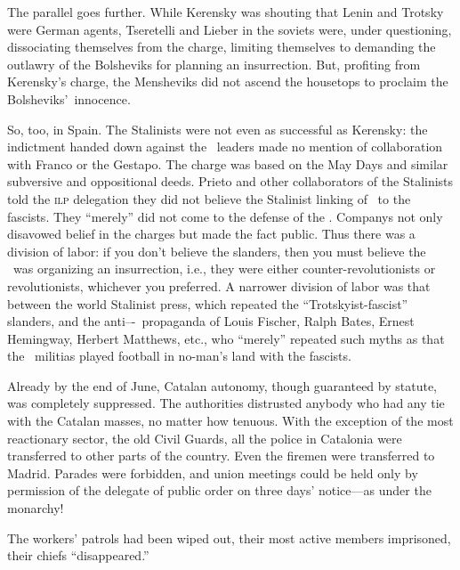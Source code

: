 The parallel goes further. While Kerensky was shouting that Lenin and Trotsky were German agents, Tseretelli and Lieber in the soviets were, under questioning, dissociating themselves from the charge, limiting themselves to demanding the outlawry of the Bolsheviks for planning an insurrection. But, profiting from Kerensky’s charge, the Mensheviks did not ascend the housetops to proclaim the Bolsheviks’~innocence.

So, too, in Spain. The Stalinists were not even as successful as Kerensky: the indictment handed down against the \POUM\ leaders made no mention of collaboration with Franco or the Gestapo. The charge was based on the May Days and similar subversive and oppositional deeds. Prieto and other collaborators of the Stalinists told the \textsc{ilp} delegation they did not believe the Stalinist linking of \POUM\ to the fascists. They ``merely'' did not come to the defense of the \POUM. Companys not only disavowed belief in the charges but made the fact public. Thus there was a division of labor: if you don’t believe the slanders, then you must believe the \POUM\ was organizing an insurrection, i.e., they were either counter-revolutionists or revolutionists, whichever you preferred. A narrower division of labor was that between the world Stalinist press, which repeated the ``Trotskyist-fascist'' slanders, and the anti--\POUM-\CNT\ propaganda of Louis Fischer,{\indexLFischer{}} Ralph Bates, Ernest Hemingway, Herbert Matthews, etc., who ``merely'' repeated such myths as that the \POUM\ militias played football in no-man’s land with the fascists.

\dinkus

Already by the end of June, Catalan autonomy, though guaranteed by statute, was completely suppressed. The authorities distrusted anybody who had any tie with the Catalan masses, no matter how tenuous. With the exception of the most reactionary sector, the old Civil Guards, all the police in Catalonia were transferred to other parts of the country. Even the firemen were transferred to Madrid. Parades were forbidden, and union meetings could be held only by permission of the delegate of public order on three days’ notice---as under the monarchy!

The workers’ patrols had been wiped out, their most active members imprisoned, their chiefs ``disappeared.''

